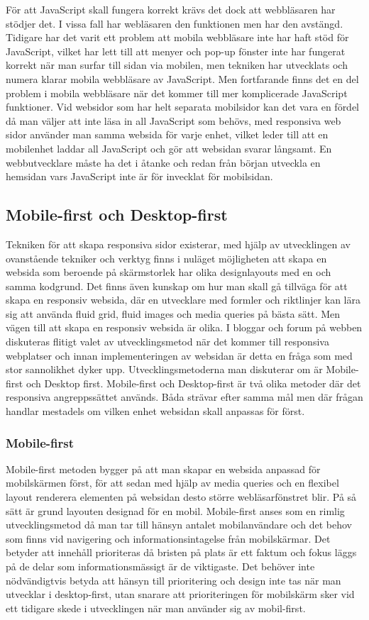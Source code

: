 \documentclass[11pt]{article}
\begin{document}
För att JavaScript skall fungera korrekt krävs det dock att webbläsaren har stödjer det. I vissa fall har webläsaren den funktionen men har den avstängd. Tidigare har det varit ett problem att mobila webbläsare inte har haft stöd för JavaScript, vilket har lett till att menyer och pop-up fönster inte har fungerat korrekt när man surfar till sidan via mobilen, men tekniken har utvecklats och numera klarar mobila webbläsare av JavaScript. Men fortfarande finns det en del problem i mobila webbläsare när det kommer till mer komplicerade JavaScript funktioner. Vid websidor som har helt separata mobilsidor kan det vara en fördel då man väljer att inte läsa in all JavaScript som behövs, med responsiva web sidor använder man samma websida för varje enhet, vilket leder till att en mobilenhet laddar all JavaScript och gör att websidan svarar långsamt. En webbutvecklare måste ha det i åtanke och redan från början utveckla en hemsidan vars JavaScript inte är för invecklat för mobilsidan.

\subsection{Mobile-first och Desktop-first}
Tekniken för att skapa responsiva sidor existerar, med hjälp av utvecklingen av ovanstående tekniker och verktyg finns i nuläget möjligheten att skapa en websida som beroende på skärmstorlek har olika designlayouts med en och samma kodgrund. Det finns även kunskap om hur man skall gå tillväga för att skapa en responsiv websida, där en utvecklare med formler och riktlinjer kan lära sig att använda fluid grid, fluid images och media queries på bästa sätt. Men vägen till att skapa en responsiv websida är olika.  I bloggar och forum på webben diskuteras flitigt valet av utvecklingsmetod när det kommer till responsiva webplatser och innan implementeringen av websidan är detta en fråga som med stor sannolikhet dyker upp. Utvecklingsmetoderna man diskuterar om är Mobile-first och Desktop first. Mobile-first och Desktop-first är två olika metoder där det responsiva angreppssättet används. Båda strävar efter samma mål men där frågan handlar mestadels om vilken enhet websidan skall anpassas för först. 

\subsubsection{Mobile-first}
Mobile-first metoden bygger på att man skapar en websida anpassad för mobilskärmen först, för att sedan med hjälp av media queries och en flexibel layout renderera elementen på websidan desto större webläsarfönstret blir.  På så sätt är grund layouten designad för en mobil. Mobile-first anses som en rimlig utvecklingsmetod då man tar till hänsyn antalet mobilanvändare och det behov som finns vid navigering och informationsintagelse från mobilskärmar.  Det betyder att innehåll prioriteras då bristen på plats är ett faktum och fokus läggs på de delar som informationsmässigt är de viktigaste. Det behöver inte nödvändigtvis betyda att hänsyn till prioritering och design inte tas när man utvecklar i desktop-first, utan snarare att prioriteringen för mobilskärm sker vid ett tidigare skede i utvecklingen när man använder sig av mobil-first.
\end{document}
